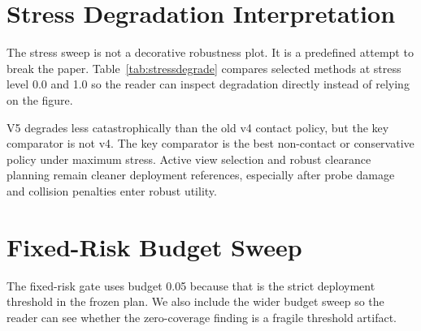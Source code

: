 \documentclass{article}
\begin{document}
\section{Stress Degradation Interpretation}
The stress sweep is not a decorative robustness plot. It is a predefined attempt to break the paper. Table~\ref{tab:stressdegrade} compares selected methods at stress level 0.0 and 1.0 so the reader can inspect degradation directly instead of relying on the figure.


\begin{table}[t]
\centering
\scriptsize
{}
\caption{Stress degradation from stress level 0.0 to 1.0. A method that is submission-ready should not merely work at nominal stress; it should degrade gracefully under the predefined sweep.}
\label{tab:stressdegrade}
\end{table}


V5 degrades less catastrophically than the old v4 contact policy, but the key comparator is not v4. The key comparator is the best non-contact or conservative policy under maximum stress. Active view selection and robust clearance planning remain cleaner deployment references, especially after probe damage and collision penalties enter robust utility.

\section{Fixed-Risk Budget Sweep}
The fixed-risk gate uses budget 0.05 because that is the strict deployment threshold in the frozen plan. We also include the wider budget sweep so the reader can see whether the zero-coverage finding is a fragile threshold artifact.
\end{document}
